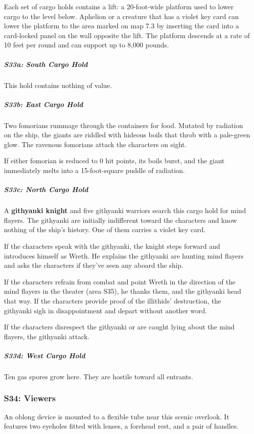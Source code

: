 \documentclass[10pt,a4paper,twoside,bg=print,twocolumn,openany,nodeprecatedcode]{dndbook}
\begin{document}
Each set of cargo holds contains a lift: a 20-foot-wide platform used to lower cargo to the level below. Aphelion or a creature that has a violet key card can lower the platform to the area marked on map 7.3 by inserting the card into a card-locked panel on the wall opposite the lift. The platform descends at a rate of 10 feet per round and can support up to 8,000 pounds.

\subparagraph{S33a: South Cargo Hold}
This hold contains nothing of value.

\subparagraph{S33b: East Cargo Hold}
Two fomorians rummage through the containers for food. Mutated by radiation on the ship, the giants are riddled with hideous boils that throb with a pale-green glow. The ravenous fomorians attack the characters on sight.

If either fomorian is reduced to 0 hit points, its boils burst, and the giant immediately melts into a 15-foot-square puddle of radiation.

\subparagraph{S33c: North Cargo Hold}
A \textbf{githyanki knight} and five githyanki warriors search this cargo hold for mind flayers. The githyanki are initially indifferent toward the characters and know nothing of the ship's history. One of them carries a violet key card.

If the characters speak with the githyanki, the knight steps forward and introduces himself as Wreth. He explains the githyanki are hunting mind flayers and asks the characters if they've seen any aboard the ship.

If the characters refrain from combat and point Wreth in the direction of the mind flayers in the theater (area S35), he thanks them, and the githyanki head that way. If the characters provide proof of the illithids' destruction, the githyanki sigh in disappointment and depart without another word.

If the characters disrespect the githyanki or are caught lying about the mind flayers, the githyanki attack.

\subparagraph{S33d: West Cargo Hold}
Ten gas spores grow here. They are hostile toward all entrants.

\subsubsection{S34: Viewers}
\begin{DndReadAloud}{}
An oblong device is mounted to a flexible tube near this scenic overlook. It features two eyeholes fitted with lenses, a forehead rest, and a pair of handles.

\end{DndReadAloud}
\end{document}
